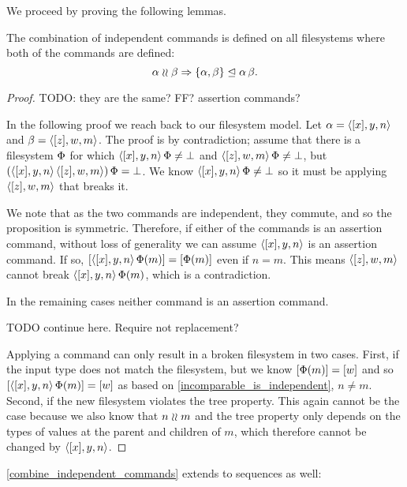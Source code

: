 We proceed by proving the following lemmas.

\begin{mylem}
The combination of independent commands is defined on all filesystems
where both of the commands are defined:
\[ \alpha\mathrel{\wr\wr} \beta \Rightarrow {\{{\alpha, \beta}\}}\trianglelefteq{\alpha\,\beta}. \]
\end{mylem}
\begin{proof}
TODO: they are the same? FF? assertion commands?

In the following proof we reach back to our filesystem model.
Let $\alpha=\langle{[x],y,n}\rangle$ and $\beta=\langle{[z],w,m}\rangle$.
The proof is by contradiction;
assume that there is a filesystem $\Phi$ for which
$\langle{[x],y,n}\rangle\,\Phi\neq\bot$ and $\langle{[z],w,m}\rangle\,\Phi\neq\bot$, but
$(\langle{[x],y,n}\rangle\, \langle{[z],w,m}\rangle)\,\Phi=\bot$.
We know $\langle{[x],y,n}\rangle\,\Phi\neq\bot$ so it must be applying 
$\langle{[z],w,m}\rangle$ that breaks it.

We note that as the two commands are independent, they commute, and so
the proposition is symmetric.
Therefore, if either of the commands is an assertion command,
without loss of generality we can assume $\langle{[x],y,n}\rangle$ is an assertion command.
If so, 
$[\langle{[x],y,n}\rangle\,\Phi(m)]=[\Phi(m)]$ even if $n=m$.
This means $\langle{[z],w,m}\rangle$ cannot break $\langle{[x],y,n}\rangle\,\Phi(m)$, which is a contradiction.

In the remaining cases neither command is an assertion command.

TODO continue here. Require not replacement?

Applying a command can only result in a broken filesystem in two cases.
First, if the input type does not match the filesystem,
but we know $[\Phi(m)]=[w]$ and so
$[\langle{[x],y,n}\rangle\,\Phi(m)]=[w]$ as based on \cref{incomparable_is_independent}, $n\neq m$.
Second, if the new filesystem violates the tree property.
This again cannot be the case because we also know that $n\mathrel{\wr\wr} m$
and the tree property only depends on the types of values at the parent and children of $m$,
which therefore cannot be changed by $\langle{[x],y,n}\rangle$.
\end{proof}

\cref{combine_independent_commands} extends to sequences as well:

